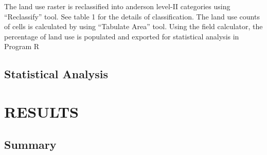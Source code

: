 \documentclass{ou-thesis}
\begin{document}
The land use raster is reclassified into anderson level-II categories using “Reclassify” tool. See table 1 for the details of classification. The land use counts of cells is calculated by using “Tabulate Area” tool. Using the field calculator, the percentage of land use is populated and exported for statistical analysis in Program R

\section{Statistical Analysis}



\chapter{RESULTS}

\section{Summary}
\end{document}
